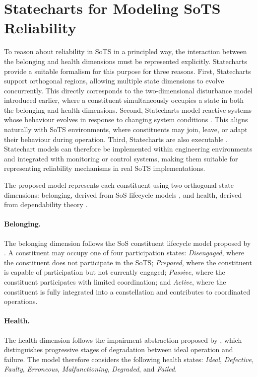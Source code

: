 \section{Statecharts for Modeling SoTS Reliability}
To reason about reliability in SoTS in a principled way, the interaction between the belonging and health dimensions must be represented explicitly. Statecharts \cite{harel1987statecharts} provide a suitable formalism for this purpose for three reasons.  First, Statecharts support orthogonal regions, allowing multiple state dimensions to evolve concurrently. This directly corresponds to the two-dimensional disturbance model introduced earlier, where a constituent simultaneously occupies a state in both the belonging and health dimensions. Second, Statecharts model reactive systems whose behaviour evolves in response to changing system conditions \cite{harel1998modeling}. This aligns naturally with SoTS environments, where constituents may join, leave, or adapt their behaviour during operation. Third, Statecharts are also executable \cite{harel1996executable}. Statechart models can therefore be implemented within engineering environments and integrated with monitoring or control systems, making them suitable for representing reliability mechanisms in real SoTS implementations.

The proposed model represents each constituent using two orthogonal state dimensions: belonging, derived from SoS lifecycle models \cite{axelsson2019refined}, and health, derived from dependability theory \cite{parhami1994multi}.

\paragraph{Belonging.}
The belonging dimension follows the SoS constituent lifecycle model proposed by \citet{axelsson2019refined}. A constituent may occupy one of four participation states: \textit{Disengaged}, where the constituent does not participate in the SoTS; \textit{Prepared}, where the constituent is capable of participation but not currently engaged; \textit{Passive}, where the constituent participates with limited coordination; and \textit{Active}, where the constituent is fully integrated into a constellation and contributes to coordinated operations.

\paragraph{Health.}
The health dimension follows the impairment abstraction proposed by \citet{parhami1994multi}, which distinguishes progressive stages of degradation between ideal operation and failure. The model therefore considers the following health states: \textit{Ideal}, \textit{Defective}, \textit{Faulty}, \textit{Erroneous}, \textit{Malfunctioning}, \textit{Degraded}, and \textit{Failed}.


